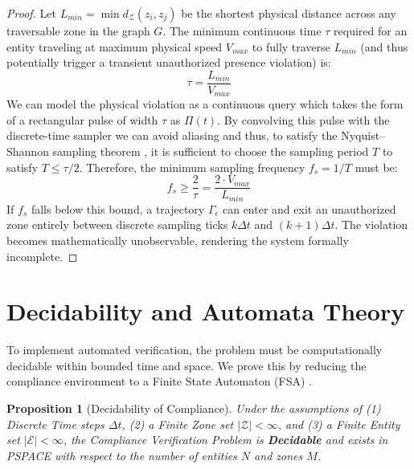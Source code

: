 \documentclass[conference]{IEEEtran}
\newtheorem{proposition}{Proposition}
\newcommand{\E}{\mathcal{E}} %
\newcommand{\Z}{\mathcal{Z}} %
\newcommand{\Tr}{\Gamma} %
\begin{document}
\begin{proof}
Let $L_{min} = \min d_\Z(z_i, z_j)$ be the shortest physical distance across any traversable zone in the graph $G$. 
The minimum continuous time $\tau$ required for an entity traveling at maximum physical speed $V_{max}$ to fully traverse $L_{min}$ (and thus potentially trigger a transient unauthorized presence violation) is:
\begin{equation}
\tau = \frac{L_{min}}{V_{max}}
\end{equation}
We can model the physical violation as a continuous query which takes the form of a rectangular pulse of width $\tau$ as $\Pi(t)$. By convolving this pulse with the discrete-time sampler we can avoid aliasing and thus, to satisfy the Nyquist–Shannon sampling theorem \cite{b4}, it is sufficient to choose the sampling period $T$ to satisfy $T \le \tau / 2$.
Therefore, the minimum sampling frequency $f_s = 1/T$ must be:
\begin{equation}
f_s \ge \frac{2}{\tau} = \frac{2 \cdot V_{max}}{L_{min}}
\end{equation}
If $f_s$ falls below this bound, a trajectory $\Tr_\epsilon$ can enter and exit an unauthorized zone entirely between discrete sampling ticks $k\Delta t$ and $(k+1)\Delta t$. The violation becomes mathematically unobservable, rendering the system formally incomplete.
\end{proof}

\section{Decidability and Automata Theory}

To implement automated verification, the problem must be computationally decidable within bounded time and space. We prove this by reducing the compliance environment to a Finite State Automaton (FSA) \cite{b5}.



\begin{proposition}[Decidability of Compliance]
Under the assumptions of (1) Discrete Time steps $\Delta t$, (2) a Finite Zone set $|\Z| < \infty$, and (3) a Finite Entity set $|\E| < \infty$, the Compliance Verification Problem is \textbf{Decidable} and exists in PSPACE with respect to the number of entities $N$ and zones $M$.
\end{proposition}
\end{document}
